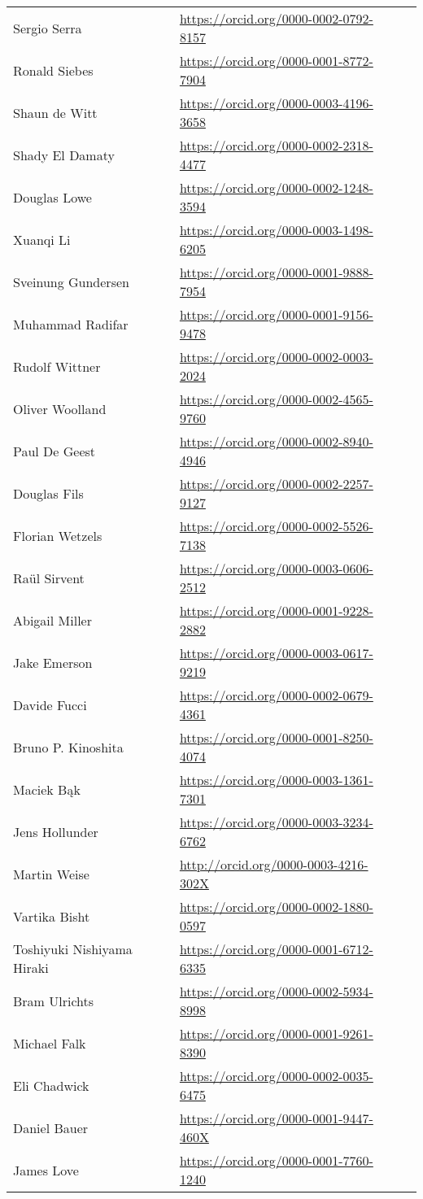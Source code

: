 \begin{longtable}{lll}
\\
  Sergio Serra & \url{https://orcid.org/0000-0002-0792-8157}
\\
  Ronald Siebes & \url{https://orcid.org/0000-0001-8772-7904}
\\
  Shaun de Witt & \url{https://orcid.org/0000-0003-4196-3658}
\\
  Shady El Damaty & \url{https://orcid.org/0000-0002-2318-4477}
\\
  Douglas Lowe & \url{https://orcid.org/0000-0002-1248-3594}
\\
  Xuanqi Li & \url{https://orcid.org/0000-0003-1498-6205}
\\
  Sveinung Gundersen & \url{https://orcid.org/0000-0001-9888-7954}
\\
  Muhammad Radifar & \url{https://orcid.org/0000-0001-9156-9478}
\\
  Rudolf Wittner & \url{https://orcid.org/0000-0002-0003-2024}
\\
  Oliver Woolland & \url{https://orcid.org/0000-0002-4565-9760}
\\
  Paul De Geest & \url{https://orcid.org/0000-0002-8940-4946}
\\
  Douglas Fils & \url{https://orcid.org/0000-0002-2257-9127}
\\
  Florian Wetzels & \url{https://orcid.org/0000-0002-5526-7138}
\\
  Raül Sirvent & \url{https://orcid.org/0000-0003-0606-2512}
\\
  Abigail Miller & \url{https://orcid.org/0000-0001-9228-2882}
\\
  Jake Emerson & \url{https://orcid.org/0000-0003-0617-9219}
\\
  Davide Fucci & \url{https://orcid.org/0000-0002-0679-4361}
\\
  Bruno P. Kinoshita & \url{https://orcid.org/0000-0001-8250-4074}
\\
  Maciek Bąk & \url{https://orcid.org/0000-0003-1361-7301}  
\\
  Jens Hollunder & \url{https://orcid.org/0000-0003-3234-6762}
\\
  Martin Weise & \url{http://orcid.org/0000-0003-4216-302X}
\\
  Vartika Bisht & \url{https://orcid.org/0000-0002-1880-0597}
\\
  Toshiyuki Nishiyama Hiraki & \url{https://orcid.org/0000-0001-6712-6335}
\\ 
  Bram Ulrichts & \url{https://orcid.org/0000-0002-5934-8998}
\\
Michael Falk & \url{https://orcid.org/0000-0001-9261-8390}
\\
Eli Chadwick & \url{https://orcid.org/0000-0002-0035-6475}
\\
Daniel Bauer & \url{https://orcid.org/0000-0001-9447-460X}
\\
James Love & \url{https://orcid.org/0000-0001-7760-1240}
\end{longtable}


